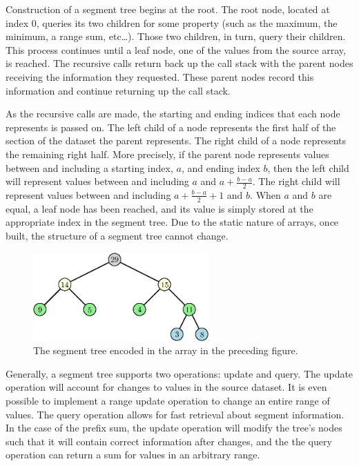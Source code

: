 Construction of a segment tree begins at the root.
The root node, located at index 0, queries its two children for some property (such as the maximum, the minimum, a range sum, etc\ldots).
Those two children, in turn, query their children.
This process continues until a leaf node, one of the values from the source array, is reached.
The recursive calls return back up the call stack with the parent nodes receiving the information they requested.
These parent nodes record this information and continue returning up the call stack.

As the recursive calls are made, the starting and ending indices that each node represents is passed on.
The left child of a node represents the first half of the section of the dataset the parent represents.
The right child of a node represents the remaining right half.
More precisely, if the parent node represents values between and including a starting index, $a$, and ending index $b$, then the left child will represent values between and including $a$ and $a + \frac{b - a}{2}$.
The right child will represent values between and including $a + \frac{b - a}{2} + 1$ and $b$.
When $a$ and $b$ are equal, a leaf node has been reached, and its value is simply stored at the appropriate index in the segment tree.
Due to the static nature of arrays, once built, the structure of a segment tree cannot change.

\begin{figure}[h]
    \centering
    \includegraphics[width=0.6\textwidth]{./structures/segment-tree/tree-visual}
    \caption{\small The segment tree encoded in the array in the preceding figure.}
\end{figure}







Generally, a segment tree supports two operations: update and query.
The update operation will account for changes to values in the source dataset.
It is even possible to implement a range update operation to change an entire range of values.
The query operation allows for fast retrieval about segment information.
In the case of the prefix sum, the update operation will modify the tree's nodes such that it will contain correct information after changes, and the the query operation can return a sum for values in an arbitrary range.

